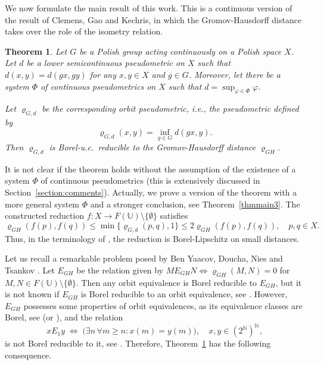 \documentclass[a4paper]{amsart}
\theoremstyle{plain}
\newtheorem{theorem}{Theorem}[section]
\theoremstyle{remark}
\begin{document}
We now formulate the main result of this work. This is a continuous version of the result of Clemens, Gao and Kechris, in which the Gromov-Hausdorff distance takes over the role of the isometry relation.


\begin{theorem} \label{thmmain1}
Let $ G $ be a Polish group acting continuously on a Polish space $ X $. Let $ d $ be a lower semicontinuous pseudometric on $ X $ such that $ d(x, y) = d(gx, gy) $ for any $ x, y \in X $ and $ g \in G $. Moreover, let there be a system $ \Phi $ of continuous pseudometrics on $ X $ such that $ d = \sup_{\varphi \in \Phi} \varphi $.

Let $ \varrho_{G, d} $ be the corresponding orbit pseudometric, i.e., the pseudometric defined by
$$ \varrho_{G, d}(x, y) = \inf_{g \in G} d(gx, y). $$
Then $ \varrho_{G, d} $ is Borel-u.c.~reducible to the Gromov-Hausdorff distance $ \varrho_{GH} $.
\end{theorem}


It is not clear if the theorem holds without the assumption of the existence of a system $ \Phi $ of continuous pseudometrics (this is extensively discussed in Section~\ref{section:comments}). Actually, we prove a version of the theorem with a more general system $ \Phi $ and a stronger conclusion, see Theorem~\ref{thmmain3}. The constructed reduction $ f : X \to F(\mathbb{U}) \setminus \{ \emptyset \} $ satisfies 
$$ \varrho_{GH}(f(p), f(q)) \leq \min \{ \varrho_{G, d}(p, q), 1 \} \leq 2 \varrho_{GH}(f(p), f(q)), \quad p, q \in X. $$
Thus, in the terminology of \cite{cdk1}, the reduction is Borel-Lipschitz on small distances.

Let us recall a remarkable problem posed by Ben Yaacov, Doucha, Nies and Tsankov \cite{bydnt}.
Let $ E_{GH} $ be the relation given by $ M E_{GH} N \Leftrightarrow \varrho_{GH}(M, N) = 0 $ for $ M, N \in F(\mathbb{U}) \setminus \{ \emptyset \} $. Then any orbit equivalence is Borel reducible to $ E_{GH} $, but it is not known if $ E_{GH} $ is Borel reducible to an orbit equivalence, see \cite[Question~8.6]{bydnt}. However, $ E_{GH} $ possesses some properties of orbit equivalences, as its equivalence classes are Borel, see \cite[Corollary~8.3]{bydnt} (or \cite[Corollary~52]{cdk1}), and the relation
$$ x E_{1} y \; \Leftrightarrow \; \big( \exists n \, \forall m \geq n : x(m) = y(m) \big), \quad x, y \in (2^\mathbb{N})^{\mathbb{N}}, $$
is not Borel reducible to it, see \cite[Theorem~24]{cdk1}. Therefore, Theorem~\ref{thmmain1} has the following consequence.
\end{document}
